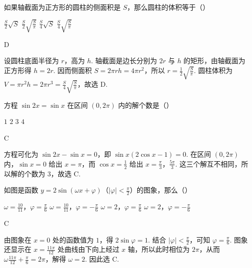 \documentclass[UTF8,a4paper,oneside,11pt]{ctexbook}
\begin{document}
\begin{problem}
如果轴截面为正方形的圆柱的侧面积是 \(S\)，那么圆柱的体积等于（\quad）

\choices
    {\(\frac{S}{2}\sqrt{S}\)}
    {\(\frac{S}{2}\sqrt{\frac{S}{\pi}}\)}
    {\(\frac{S}{4}\sqrt{S}\)}
    {\(\frac{S}{4}\sqrt{\frac{S}{\pi}}\)}

\begin{answer}
D
\end{answer}

\begin{solution}
设圆柱底面半径为 \(r\)，高为 \(h\). 轴截面是边长分别为 \(2r\) 与 \(h\) 的矩形，由轴截面为正方形得 \(h=2r\). 因而侧面积 \(S=2\pi rh=4\pi r^2\)，所以 \(r=\frac{1}{2}\sqrt{\frac{S}{\pi}}\). 圆柱体积为 \(V=\pi r^2h=2\pi r^3=\frac{S}{4}\sqrt{\frac{S}{\pi}}\)，故选 D.
\end{solution}
\end{problem}

\begin{problem}
方程 \(\sin 2x=\sin x\) 在区间 \((0,2\pi)\) 内的解个数是（\quad）

\choices
    {\(1\)}
    {\(2\)}
    {\(3\)}
    {\(4\)}

\begin{answer}
C
\end{answer}

\begin{solution}
方程可化为 \(\sin 2x-\sin x=0\)，即 \(\sin x(2\cos x-1)=0\). 在区间 \((0,2\pi)\) 内，\(\sin x=0\) 给出 \(x=\pi\)，而 \(\cos x=\frac{1}{2}\) 给出 \(x=\frac{\pi}{3}\)，\(\frac{5\pi}{3}\). 这三个解互不相同，所以解的个数为 \(3\)，故选 C.
\end{solution}
\end{problem}

\begin{problem}
如图是函数 \(y=2\sin\left( \omega x+\varphi \right)\)（\(\left| \varphi \right|<\frac{\pi}{2}\)）的图象，那么（\quad）


\choices
    {\(\omega=\frac{10}{11}\)，\(\varphi=\frac{\pi}{6}\)}
    {\(\omega=\frac{10}{11}\)，\(\varphi=-\frac{\pi}{6}\)}
    {\(\omega=2\)，\(\varphi=\frac{\pi}{6}\)}
    {\(\omega=2\)，\(\varphi=-\frac{\pi}{6}\)}

\begin{answer}
C
\end{answer}

\begin{solution}
由图象在 \(x=0\) 处的函数值为 \(1\)，得 \(2\sin\varphi=1\). 结合 \(\lvert\varphi\rvert<\frac{\pi}{2}\)，可知 \(\varphi=\frac{\pi}{6}\). 图象还显示在 \(x=\frac{11\pi}{12}\) 处曲线由下向上经过 \(x\) 轴，所以此时相位为 \(2\pi\)，从而 \(\omega\frac{11\pi}{12}+\frac{\pi}{6}=2\pi\)，解得 \(\omega=2\). 因此选 C.
\end{solution}
\end{problem}
\end{document}
